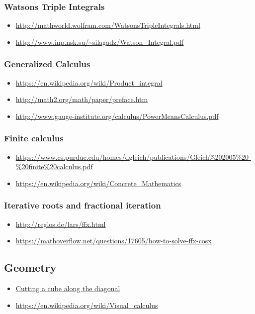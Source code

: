 \subsubsection{Watsons Triple Integrals}
\begin{itemize}
\item \url{http://mathworld.wolfram.com/WatsonsTripleIntegrals.html}
\item \url{http://www.inp.nsk.su/~silagadz/Watson_Integral.pdf}
\end{itemize}

\subsubsection{Generalized Calculus}
\begin{itemize}
\item \url{https://en.wikipedia.org/wiki/Product_integral}
\item \url{http://math2.org/math/paper/preface.htm}
\item \url{http://www.gauge-institute.org/calculus/PowerMeansCalculus.pdf}
\end{itemize}

\subsubsection{Finite calculus}
\begin{itemize}
\item \url{https://www.cs.purdue.edu/homes/dgleich/publications/Gleich\%202005\%20-\%20finite\%20calculus.pdf}
\item \url{https://en.wikipedia.org/wiki/Concrete_Mathematics}
\end{itemize}

\subsubsection{Iterative roots and fractional iteration}
\begin{itemize}
\item \url{http://reglos.de/lars/ffx.html}
\item \url{https://mathoverflow.net/questions/17605/how-to-solve-ffx-cosx}
\end{itemize}

\subsection{Geometry}
\begin{itemize}
\item \href{https://www.friedrich-verlag.de/fileadmin/redaktion/sekundarstufe/Mathematik/Der_Mathematikunterricht/Leseproben/Der_Mathematikunterricht_3_13_Leseprobe_2.pdf}{Cutting a cube along the diagonal}
\item \url{https://en.wikipedia.org/wiki/Visual_calculus}
\end{itemize}

